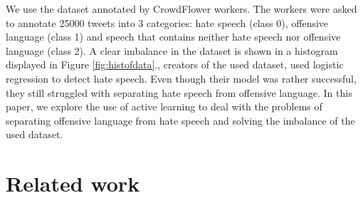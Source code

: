 \documentclass[10pt, a4paper]{article}
\begin{document}
We use the dataset annotated by CrowdFlower workers. The workers were asked to annotate 25000 tweets into 3 categories: hate speech (class 0), offensive language (class 1) and speech that contains neither hate speech nor offensive language (class 2). A clear imbalance in the dataset is shown in a histogram displayed in Figure \ref{fig:histofdata}.\cite{Davidson2017AutomatedHS}, creators of the used dataset, used logistic regression to detect hate speech. Even though their model was rather successful, they still struggled with separating hate speech from offensive language. In this paper, we explore the use of active learning to deal with the problems of separating offensive language from hate speech and solving the imbalance of the used dataset.


\section{Related work}
\end{document}
